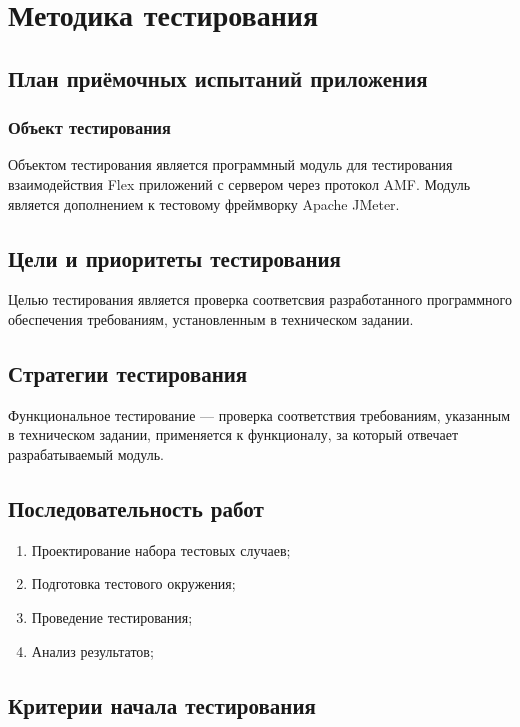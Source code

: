 \chapter{Методика тестирования}

\section{План приёмочных испытаний приложения}

\subsection{Объект тестирования}

Объектом тестирования является программный модуль для тестирования взаимодействия Flex приложений с сервером через
протокол AMF. Модуль является дополнением к тестовому фреймворку Apache JMeter.

\section{Цели и приоритеты тестирования}

Целью тестирования является проверка соответсвия разработанного программного обеспечения требованиям, установленным
в техническом задании.

\section{Стратегии тестирования}

Функциональное тестирование --- проверка соответствия требованиям, указанным в техническом задании,
применяется к функционалу, за который отвечает разрабатываемый модуль.

\section{Последовательность работ}

\begin{enumerate}
\item Проектирование набора тестовых случаев;
\item Подготовка тестового окружения;
\item Проведение тестирования;
\item Анализ результатов;
\end{enumerate}

\section{Критерии начала тестирования}

